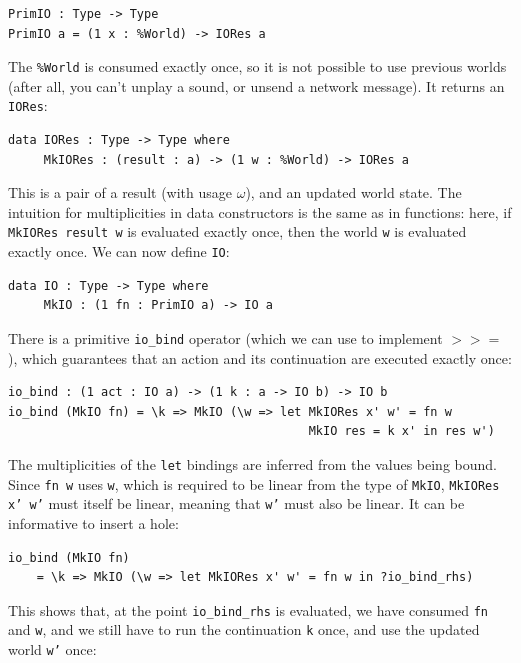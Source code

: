 \begin{lstlisting}
PrimIO : Type -> Type
PrimIO a = (1 x : %World) -> IORes a
\end{lstlisting}

The \texttt{\%World} is consumed exactly once, so
it is not possible to use previous worlds (after all, you
can't unplay a sound, or unsend a network message). It returns an
\texttt{IORes}:

\begin{lstlisting}
data IORes : Type -> Type where
     MkIORes : (result : a) -> (1 w : %World) -> IORes a
\end{lstlisting}

This is a pair of a result (with usage $\omega$), 
and an updated world state. The
intuition for multiplicities in data constructors is the same as 
in functions: here, if \texttt{MkIORes result w} is evaluated exactly once, then
the world \texttt{w} is evaluated exactly once.
We can now define \texttt{IO}:

\begin{lstlisting}
data IO : Type -> Type where
     MkIO : (1 fn : PrimIO a) -> IO a
\end{lstlisting}

There is a primitive \texttt{io\_bind} operator (which we can use to implement
$\mathtt{>>=}$), which guarantees that an action and its continuation are
executed exactly once:

\label{sec:iobind}
\begin{lstlisting}
io_bind : (1 act : IO a) -> (1 k : a -> IO b) -> IO b
io_bind (MkIO fn) = \k => MkIO (\w => let MkIORes x' w' = fn w
                                          MkIO res = k x' in res w')
\end{lstlisting}

The multiplicities of the \texttt{let} bindings are inferred from the values
being bound. Since \texttt{fn w} uses \texttt{w}, which is required to be
linear from the type of \texttt{MkIO}, \texttt{MkIORes x' w'} must itself be
linear, meaning that \texttt{w'} must also be linear. It can be informative
to insert a hole:

\begin{lstlisting}
io_bind (MkIO fn)
    = \k => MkIO (\w => let MkIORes x' w' = fn w in ?io_bind_rhs)
\end{lstlisting}

This shows that, at the point \texttt{io\_bind\_rhs} is evaluated, we have
consumed \texttt{fn} and \texttt{w}, and we still have to run the continuation
\texttt{k} once, and use the updated world \texttt{w'} once:

